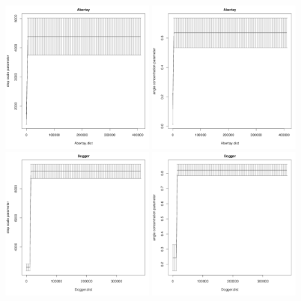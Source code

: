 \documentclass[12pt]{article}\usepackage[]{graphicx}\usepackage[]{color}
\begin{document}
\begin{figure}[htbp]
  \includegraphics[width=0.49\textwidth]{plot_greySealResults002.pdf}
  \includegraphics[width=0.49\textwidth]{plot_greySealResults009.pdf}\\
  \includegraphics[width=0.49\textwidth]{plot_greySealResults006.pdf}
  \includegraphics[width=0.49\textwidth]{plot_greySealResults013.pdf}\\

\end{figure}
\end{document}
